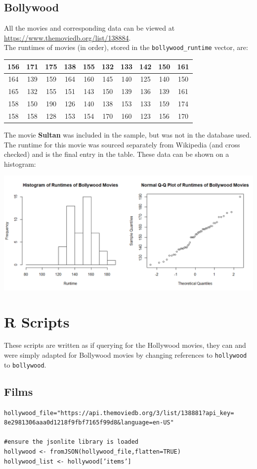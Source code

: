 \documentclass{article}
\begin{document}
\subsection{Bollywood}
\label{sec:bollywood}
All the movies and corresponding data can be viewed at \url{https://www.themoviedb.org/list/138884}.\\
The runtimes of movies (in order), stored in the \texttt{bollywood\_runtime} vector, are:
\begin{center}\begin{tabular}{ |c|c|c|c|c|c|c|c|c|c| }
\hline
156&171&175&138&155&132&133&142&150&161\\
\hline
164&139&159&164&160&145&140&125&140&150\\
\hline
165&132&155&151&143&150&139&136&139&161\\
\hline
158&150&190&126&140&138&153&133&159&174\\
\hline
158&158&128&153&154&170&160&123&156&170\\
\hline
\end{tabular}\end{center}
The movie \textbf{Sultan} was included in the sample, but was not in the database used. The runtime for this movie was sourced separately from Wikipedia (and cross checked) and is the final entry in the table.
\newpage
These data can be shown on a histogram:
\begin{center}
\includegraphics[scale=0.6]{bollywood_runtime.png}
\end{center}
\section{R Scripts}
These scripts are written as if querying for the Hollywood movies, they can and were simply adapted for Bollywood movies by changing references to \texttt{hollywood} to \texttt{bollywood}.
\subsection{Films}
\label{sec:films}
\texttt{hollywood\_file="https://api.themoviedb.org/3/list/138881?api\_key=\\8e2981306aaa0d1218f9fbf7165f99d8\&language=en-US"}\\\\
\texttt{\#ensure the jsonlite library is loaded\\
hollywood <- fromJSON(hollywood\_file,flatten=TRUE)\\
hollywood\_list <- hollywood['items']}
\end{document}
